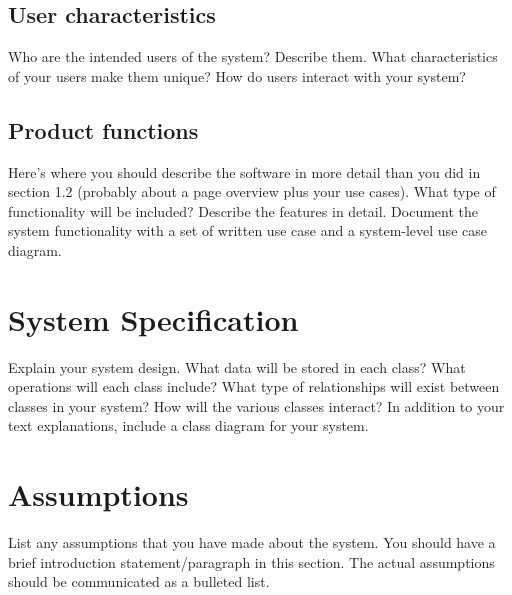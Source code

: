 \documentclass{report}
\begin{document}
\subsection{User characteristics}
Who are the intended users of the system? Describe them. What characteristics of your users make them unique?  How do users interact with your system?\par
\subsection{Product functions}
Here’s where you should describe the software in more detail than you did in section 1.2 (probably about a page overview plus your use cases). What type of functionality will be included? Describe the features in detail. Document the system functionality with a set of written use case and a system-level use case diagram.\par
\section{System Specification}
Explain your system design. What data will be stored in each class?  What operations will each class include?  What type of relationships will exist between classes in your system? How will the various classes interact? In addition to your text explanations, include a class diagram for your system.\par
\section{Assumptions}
List any assumptions that you have made about the system. You should have a brief introduction statement/paragraph in this section. The actual assumptions should be communicated as a bulleted list.\par


%



\end{document}

